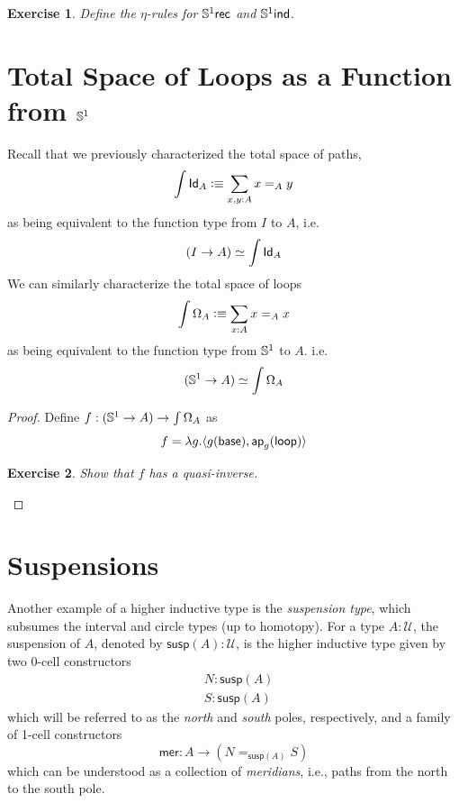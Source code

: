 \documentclass[11pt]{article}
\newcommand*{\ap}{\mathsf{ap}}
\newcommand{\U}{\mathcal{U}}
\newcommand{\susp}{\ensuremath{\mathsf{susp}}\xspace}
\newcommand{\mer}{\ensuremath{\mathsf{mer}}\xspace}
\newtheorem*{exercise}{Exercise}
\begin{document}
\begin{exercise}
Define the $\eta$-rules for $\mathbb{S}^1\mathsf{rec}$ and $\mathbb{S}^1\mathsf{ind}$.
\end{exercise}

\section{Total Space of Loops as a Function from $\mathbb{S}^1$}
Recall that we previously characterized the total space of paths,
\[ \int \mathsf{Id}_{A} \vcentcolon\equiv \sum_{x,y:A}x =_A y\]
as being equivalent to the function type from $I$ to $A$, i.e.
\[ (I\to A) \simeq \int\mathsf{Id}_{A} \]
We can similarly characterize the total space of loops
\[ \int\Omega_A\vcentcolon\equiv\sum_{x:A}x=_Ax \]
as being equivalent to the function type from $\mathbb{S}^1$ to $A$. i.e.
\[ (\mathbb{S}^1\to A) \simeq \int\Omega_A\]
\begin{proof}
Define $f : (\mathbb{S}^1\to A)\to\int\Omega_A$ as
\[ f = \lambda g.\langle g(\base), \ap_g(\lloop)\rangle \]

\begin{exercise}
Show that $f$ has a quasi-inverse.
\end{exercise}
\end{proof}

\section{Suspensions}\label{}

Another example of a higher inductive type is the \emph{suspension type}, which subsumes the interval and circle types (up to homotopy). For a type $A : \U$, the suspension of $A$, denoted by $\susp(A) : \U$, is the higher inductive type given by two 0-cell constructors 
\begin{align*}
& N : \susp(A) \\
& S: \susp(A)
\end{align*}
which will be referred to as the \emph{north} and \emph{south} poles, respectively, and a family of 1-cell constructors \[\mer : A \to (N =_{\susp(A)} S)\] which can be understood as a collection of \emph{meridians}, i.e., paths from the north to the south pole.
\end{document}
